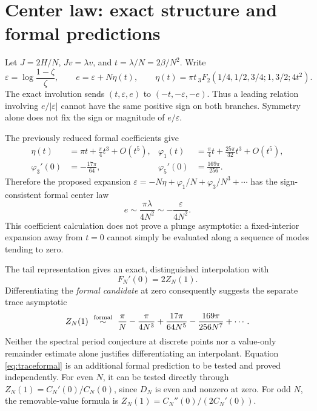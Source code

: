 \documentclass[10pt]{article}
\begin{document}
\section{Center law: exact structure and formal predictions}
Let $J=2H/N$, $Jv=\lambda v$, and $t=\lambda/N=2\beta/N^2$.
Write
\[
\varepsilon=\log\frac{1-\zeta}{\zeta},\qquad
e=\varepsilon+N\eta(t),\qquad
\eta(t)=\pi t\,{}_3F_2(1/4,1/2,3/4;1,3/2;4t^2).
\]
The exact involution sends $(t,\varepsilon,e)$ to
$(-t,-\varepsilon,-e)$. Thus a leading relation involving
$e/|\varepsilon|$ cannot have the same positive sign on both branches.
Symmetry alone does not fix the sign or magnitude of $e/\varepsilon$.

The previously reduced formal coefficients \cite{periods} give
\begin{align}
\eta(t)&=\pi t+\tfrac\pi4t^3+O(t^5),&
\varphi_1(t)&=\tfrac\pi4t+\tfrac{25\pi}{32}t^3+O(t^5),\nonumber\\
\varphi_3'(0)&=-\tfrac{17\pi}{64},&
\varphi_5'(0)&=\tfrac{169\pi}{256}.
\label{eq:formal}
\end{align}
Therefore the proposed expansion
$\varepsilon=-N\eta+\varphi_1/N+\varphi_3/N^3+\cdots$
has the sign-consistent formal center law
\begin{equation}
e\sim\frac{\pi\lambda}{4N^2}
\sim-\frac{\varepsilon}{4N^2}.
\label{eq:center}
\end{equation}
This coefficient calculation does not prove a plunge asymptotic:
a fixed-interior expansion away from $t=0$ cannot simply be evaluated
along a sequence of modes tending to zero.

The tail representation gives an exact, distinguished interpolation
with
\begin{equation}
F_N'(0)=2Z_N(1).
\label{eq:slope}
\end{equation}
Differentiating the \emph{formal candidate} at zero consequently
suggests the separate trace asymptotic
\begin{equation}
Z_N(1)\ \mathrel{\stackrel{\rm formal}{\sim}}\
\frac\pi N-\frac{\pi}{4N^3}
+\frac{17\pi}{64N^5}-\frac{169\pi}{256N^7}+\cdots .
\label{eq:traceformal}
\end{equation}
Neither the spectral period conjecture at discrete points nor a
value-only remainder estimate alone justifies differentiating an
interpolant. Equation \eqref{eq:traceformal} is an additional formal
prediction to be tested and proved independently.
For even $N$, it can be tested directly through
$Z_N(1)=C_N'(0)/C_N(0)$, since $D_N$ is even and nonzero at zero.
For odd $N$, the removable-value formula is
$Z_N(1)=C_N''(0)/(2C_N'(0))$.
\end{document}
